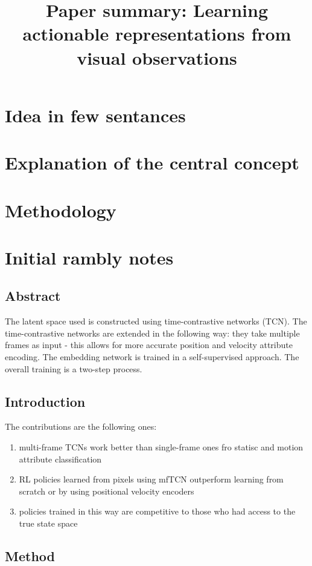 \documentclass{article}
\title{Paper summary: Learning actionable representations from visual observations}
\begin{document}
\maketitle


\section{Idea in few sentances}

\section{Explanation of the central concept}


\section{Methodology}


\section{Initial rambly notes}


\subsection{Abstract}
The latent space used is constructed using time-contrastive networks (TCN).
The time-contrastive networks are extended in the following way:
they take multiple frames as input - this allows for more accurate
position and velocity attribute encoding.
The embedding network is trained in a self-supervised approach.
The overall training is a two-step process.


\subsection{Introduction}
The contributions are the following ones:
\begin{enumerate}
		\item multi-frame TCNs work better than single-frame ones fro
				statisc and motion attribute classification
		\item RL policies learned from pixels using mfTCN outperform learning from scratch
				or by using positional velocity encoders
		\item policies trained in this way are competitive to those
				who had access to the true state space
\end{enumerate}

\subsection{Method}
\end{document}
